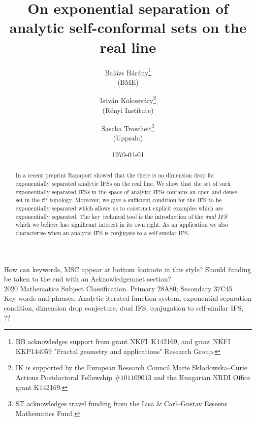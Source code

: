 \documentclass[12pt,]{article}
\title{On exponential separation of analytic self-conformal sets on the real line}
\author{Bal\'azs B\'ar\'any\footnote{BB acknowledges support from grant NKFI~K142169, and grant NKFI KKP144059 "Fractal geometry and applications" Research Group.}\\(BME) \and Istv\'an
  Kolossv\'ary\footnote{IK is supported by the European Research Council Marie Sk\l odowska--Curie Actions Postdoctoral Fellowship $\#101109013$ and the Hungarian NRDI Office grant K142169.}\\ (R\'enyi Institute) \and Sascha
Troscheit\footnote{ST acknowledges travel funding from the Lisa \& Carl--Gustav Esseens Mathematics
Fund.} \\(Uppsala)}
\date{\today}
\def\cref#1{\ref{#1}}%
\theoremstyle{definition}
\theoremstyle{remark}
\newcommand{\0}{\mathbf{0}}
\newcommand{\bu}{\mathbf{u}}
\begin{document}
\frenchspacing
\maketitle

{\color{red}
How can keywords, MSC appear at bottom footnote in this style? Should funding be taken to the end with an Acknowledgemnet section? \\
2020 Mathematics Subject Classification.  Primary 28A80; Secondary 37C45 \\
Key words and phrases. Analytic iterated function system, exponential separation condition, dimension drop conjecture, dual IFS, conjugation to self-similar IFS, ?? 
}

\begin{abstract}
In a recent preprint Rapaport showed that the there is no dimension drop for
exponentially separated analytic IFSs on the real line. We show that the set of such exponentially
separated IFSs in the space of analytic IFSs contains an open and dense set in the $\mathcal{C}^2$
topology. Moreover, we give a sufficient condition for the IFS to be exponentially separated which
allows us to construct explicit examples which are exponentially separated. The key
technical tool is the introduction of the \emph{dual IFS} which we believe has significant interest
in its own right. As an application we also characterise when an analytic IFS is conjugate to a
self-similar IFS. 
\end{abstract}


\end{document}
